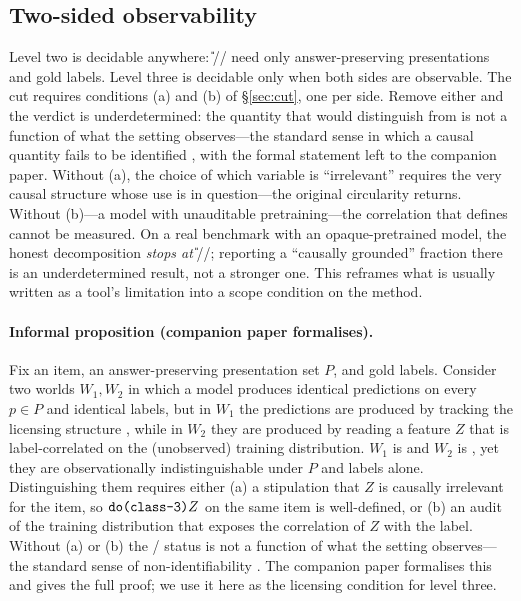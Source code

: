 \subsection{Two-sided observability}
Level two is decidable anywhere: \U{}/\SW{}/\SC{} need only
answer-preserving presentations and gold labels. Level three is decidable
only when both sides are observable. The cut requires conditions (a) and (b) of
\S\ref{sec:cut}, one per side. Remove either and the verdict is
underdetermined: the quantity that would distinguish \scg{} from \scs{}
is not a function of what the setting observes---the standard sense in which a
causal quantity fails to be identified
\citep{pearl2009causality,pearl2014external}, with the formal statement left to
the companion paper. Without (a), the choice of which variable is ``irrelevant''
requires the very causal structure whose use is in question---the original
circularity returns. Without (b)---a model with unauditable pretraining---the
correlation that defines \scs{} cannot be measured. On a real benchmark with an
opaque-pretrained model, the honest decomposition \emph{stops at} \U{}/\SW{}/\SC{};
reporting a ``causally grounded'' fraction there is an underdetermined result,
not a stronger one. This reframes what is usually written as a tool's limitation
into a scope condition on the method.

\paragraph{Informal proposition (companion paper formalises).}
Fix an item, an answer-preserving presentation set $P$, and gold labels.
Consider two worlds $W_1, W_2$ in which a model produces identical
predictions on every $p\in P$ and identical labels, but in $W_1$ the
predictions are produced by tracking the licensing structure \Mstr{},
while in $W_2$ they are produced by reading a feature $Z$ that is
label-correlated on the (unobserved) training distribution.
$W_1$ is \scg{} and $W_2$ is \scs{}, yet they are observationally
indistinguishable under $P$ and labels alone. Distinguishing them
requires either (a) a stipulation that $Z$ is causally irrelevant for
the item, so $\texttt{do(class-3)}{Z}$ on the same item is well-defined, or (b) an
audit of the training distribution that exposes the correlation of $Z$
with the label. Without (a) or (b) the \scg{}/\scs{} status is not a
function of what the setting observes---the standard sense of
non-identifiability \citep{pearl2009causality,pearl2014external}. The
companion paper formalises this and gives the full proof; we use it here
as the licensing condition for level three.

